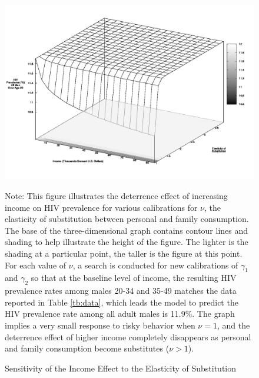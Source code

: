 \documentclass[12pt]{article}
\begin{document}
\begin{figure}
\begin{center}
\caption{Sensitivity of the Income Effect to the Elasticity of Substitution}\label{fg:incomenu}
\includegraphics[scale=0.33]{images/hiv_gdpsub.png} \\
\parbox{5.5in}{\footnotesize{Note: This figure illustrates the deterrence effect of increasing income on HIV prevalence for various calibrations for $\nu$, the elasticity of substitution between personal and family consumption.  The base of the three-dimensional graph contains contour lines and shading to help illustrate the height of the figure.  The lighter is the shading at a particular point, the taller is the figure at this point.  For each value of $\nu$, a search is conducted for new calibrations of $\gamma_1$ and $\gamma_2$ so that at the baseline level of income, the resulting HIV prevalence rates among males 20-34 and 35-49 matches the data reported in Table \ref{tb:data}, which leads the model to predict the HIV prevalence rate among all adult males is 11.9\%.  The graph implies a very small response to risky behavior when $\nu=1$, and the deterrence effect of higher income completely disappears as personal and family consumption become substitutes ($\nu>1$).}}
\end{center}
\end{figure}
\end{document}
